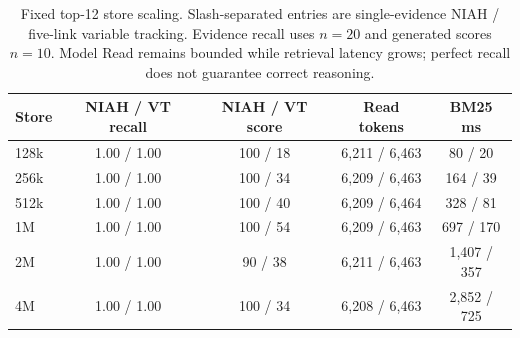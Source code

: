 \begin{table}[htbp]
\centering
\small
\setlength{\tabcolsep}{4pt}
\begin{tabular}{@{}lcccc@{}}
\toprule
Store & NIAH / VT recall & NIAH / VT score & Read tokens & BM25 ms \\
\midrule
128k & 1.00 / 1.00 & 100 / 18 & 6,211 / 6,463 & 80 / 20 \\
256k & 1.00 / 1.00 & 100 / 34 & 6,209 / 6,463 & 164 / 39 \\
512k & 1.00 / 1.00 & 100 / 40 & 6,209 / 6,464 & 328 / 81 \\
1M & 1.00 / 1.00 & 100 / 54 & 6,209 / 6,463 & 697 / 170 \\
2M & 1.00 / 1.00 & 90 / 38 & 6,211 / 6,463 & 1,407 / 357 \\
4M & 1.00 / 1.00 & 100 / 34 & 6,208 / 6,463 & 2,852 / 725 \\
\bottomrule
\end{tabular}
\caption{Fixed top-12 store scaling. Slash-separated entries are single-evidence NIAH / five-link variable tracking. Evidence recall uses $n=20$ and generated scores $n=10$. Model Read remains bounded while retrieval latency grows; perfect recall does not guarantee correct reasoning.}
\label{tab:store-scale}
\end{table}
